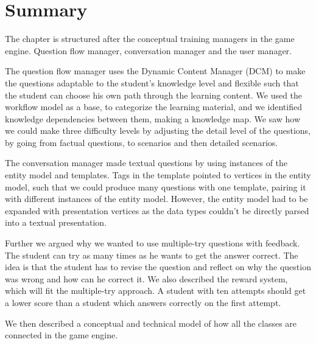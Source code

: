 \section{Summary}
The chapter is structured after the conceptual training managers in the game engine. Question flow manager, conversation manager and the user manager.

The question flow manager uses the Dynamic Content Manager (DCM) to make the questions adaptable to the student's knowledge level and flexible such that the student can choose his own path through the learning content. We used the workflow model as a base, to categorize the learning material, and we identified knowledge dependencies between them, making a knowledge map. We saw how we could make three difficulty levels by adjusting the detail level of the questions, by going from factual questions, to scenarios and then detailed scenarios. 

The conversation manager made textual questions by using instances of the entity model and templates. Tags in the template pointed to vertices in the entity model, such that we could produce many questions with one template, pairing it with different instances of the entity model. However, the entity model had to be expanded with presentation vertices as the data types couldn't be directly parsed into a textual presentation. 

Further we argued why we wanted to use multiple-try questions with feedback. The student can try as many times as he wants to get the answer correct. The idea is that the student has to revise the question and reflect on why the question was wrong and how can he correct it. We also described the reward system, which will fit the multiple-try approach. A student with ten attempts should get a lower score than a student which answers correctly on the first attempt.

We then described a conceptual and technical model of how all the classes are connected in the game engine.



